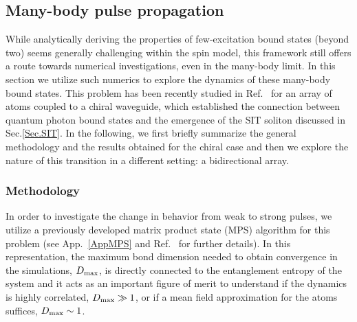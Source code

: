 \documentclass[pra,twocolumn,showpacs,preprintnumbers,amsmath,amssymb]{revtex4-1}
\begin{document}
\subsection{Many-body pulse propagation}\label{Sec_TLA_many}




While analytically deriving the properties of few-excitation bound states (beyond two) seems generally challenging within the spin model, this framework still offers a route towards numerical investigations, even in the many-body limit. 
In this section we utilize such numerics to explore the dynamics of these many-body bound states.  This problem has been recently studied in Ref.~\cite{mahmo_calajo} for an array of atoms coupled to a chiral waveguide, which established the connection between quantum photon bound states
 and the emergence of the SIT soliton discussed in Sec.\ref{Sec.SIT}. In the following, we first briefly summarize the general methodology and the results obtained for the chiral case and then we explore the nature of this transition in a different setting: a bidirectional array.




\subsubsection{Methodology}\label{Secmet}

In order to investigate the change in behavior from weak to strong pulses, we utilize a previously developed matrix product state (MPS) algorithm for this problem (see App.~\ref{AppMPS} and Ref.~\cite{MPSJames,james_ryd,mahmo_calajo} for further details). In this representation, the maximum bond dimension needed to obtain convergence in the simulations, $D_{\rm max}$, is directly connected to the entanglement entropy of the system and it acts as an important figure of merit to understand if the dynamics is highly correlated, $D_{\rm max}\gg1$, or if a mean field approximation for the atoms suffices,  $D_{\rm max}\sim 1$.
\end{document}
